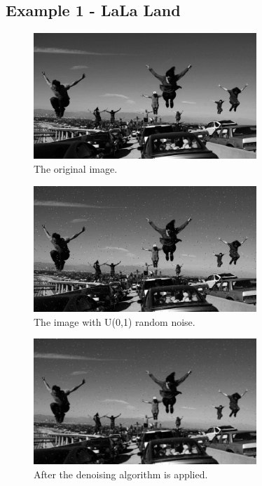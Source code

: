 \documentclass{article}
\begin{document}
\subsection{Example 1 - LaLa Land}

\begin{figure}[H]
    \begin{center}
        \includegraphics[width=0.75\textwidth]{LLL.jpg}
    \end{center}
  \caption{The original image.}
\end{figure}

\begin{figure}[H]
    \begin{center}
        \includegraphics[width=0.75\textwidth]{noised_LLL.jpg}
    \end{center}
  \caption{The image with U(0,1) random noise.}
\end{figure}

\begin{figure}[H]
    \begin{center}
        \includegraphics[width=0.75\textwidth]{denoised_LLL.jpg}
    \end{center}
  \caption{After the denoising algorithm is applied.}
\end{figure}
\end{document}
